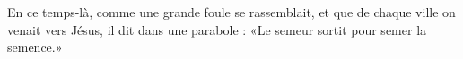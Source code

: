 En ce temps-là, comme une grande foule se rassemblait,
	et que de chaque ville on venait vers Jésus, il dit dans une parabole :
	«Le semeur sortit pour semer la semence.»
